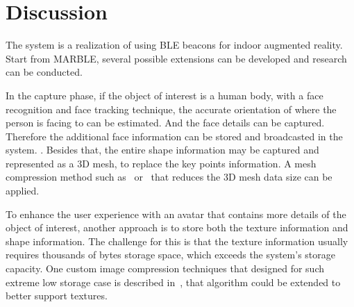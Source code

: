 \section{Discussion}
\label{sec:discussion}

The system is a realization of using BLE beacons for indoor augmented reality. Start from MARBLE, several possible extensions can be developed and research can be conducted.

In the capture phase, if the object of interest is a human body, with a face recognition and face tracking technique, the accurate orientation of where the person is facing to can be estimated. And the face details can be captured. Therefore the additional face information can be stored and broadcasted in the system. . Besides that, the entire shape information may be captured and represented as a 3D mesh, to replace the key points information. A mesh compression method such as~\cite{DRACOBLOG} or~\cite{valette2004wavelet} that reduces the 3D mesh data size can be applied.

To enhance the user experience with an avatar that contains more details of the object of interest, another approach is to store both the texture information and shape information. The challenge for this is that the texture information usually requires thousands of bytes storage space, which exceeds the system's storage capacity. One custom image compression techniques that designed for such extreme low storage case is described in~\cite{shaoyears}, that algorithm could be extended to better support textures.

